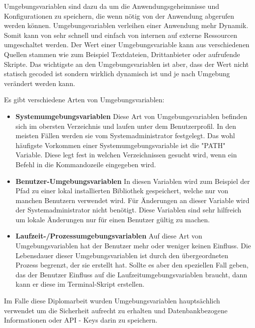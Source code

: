 Umgebungsvariablen sind dazu da um die Anwendungsgeheimnisse und Konfigurationen zu speichern, die wenn nötig von der Anwendung abgerufen werden können. Umgebungsvariablen verleihen einer Anwendung mehr Dynamik. Somit kann von sehr schnell und einfach von internen auf externe Ressourcen umgeschaltet werden. Der Wert einer Umgebungsvariable kann aus verschiedenen Quellen stammen wie zum Beispiel Textdateien, Drittanbieter oder aufrufende Skripte. Das wichtigste an den Umgebungsvariablen ist aber, dass der Wert nicht statisch gecoded ist sondern wirklich dynamisch ist und je nach Umgebung verändert werden kann.

Es gibt verschiedene Arten von Umgebungsvariablen:

\begin{itemize}
    \item \textbf{Systemumgebungsvariablen}
        \newline
        Diese Art von Umgebungsvariablen befinden sich im obersten Verzeichnis und laufen unter dem Benutzerprofil. In den meisten Fällen werden sie vom Systemadministrator festgelegt. Das wohl häufigste Vorkommen einer Systemumgebungsvariable ist die "PATH" Variable. Diese legt fest in welchen Verzeichnissen gesucht wird, wenn ein Befehl in die Kommandozeile eingegeben wird.
        \cite{path_setzen}
        
    \item \textbf{Benutzer-Umgebungsvariablen}
        \newline
        In diesen Variablen wird zum Beispiel der Pfad zu einer lokal installierten Bibliothek gespeichert, welche nur von manchen Benutzern verwendet wird. Für Änderungen an dieser Variable wird der Systemadministrator nicht benötigt. Diese Variablen sind sehr hilfreich um lokale Änderungen nur für einen Benutzer gültig zu machen.
    \item \textbf{Laufzeit-/Prozessumgebungsvariablen}
        \newline
        Auf diese Art von Umgebungsvariablen hat der Benutzer mehr oder weniger keinen Einfluss. Die Lebensdauer dieser Umgebungsvariablen ist durch den übergeordneten Prozess begrenzt, der sie erstellt hat.
        Sollte es aber den speziellen Fall geben, das der Benutzer Einfluss auf die Laufzeitumgebungsvariablen braucht, dann kann er diese im Terminal-Skript erstellen.
\end{itemize}

Im Falle diese Diplomarbeit wurden Umgebungsvariablen hauptsächlich verwendet um die Sicherheit aufrecht zu erhalten und Datenbankbezogene Informationen oder API - Keys darin zu speichern.

